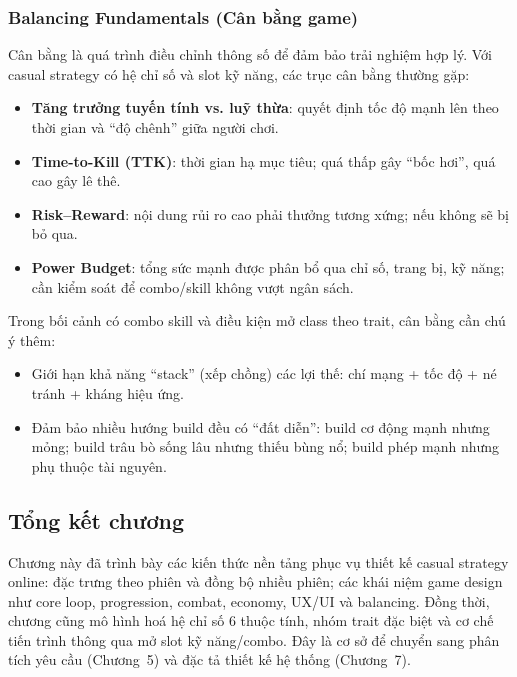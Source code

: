 \subsubsection{Balancing Fundamentals (Cân bằng game)}

Cân bằng là quá trình điều chỉnh thông số để đảm bảo trải nghiệm hợp lý\cite{adams-game-design,schell-art}. Với casual strategy có hệ chỉ số và slot kỹ năng, các trục cân bằng thường gặp:

\begin{itemize}
    \item \textbf{Tăng trưởng tuyến tính vs. luỹ thừa}: quyết định tốc độ mạnh lên theo thời gian và ``độ chênh'' giữa người chơi.
    \item \textbf{Time-to-Kill (TTK)}: thời gian hạ mục tiêu; quá thấp gây ``bốc hơi'', quá cao gây lê thê.
    \item \textbf{Risk--Reward}: nội dung rủi ro cao phải thưởng tương xứng; nếu không sẽ bị bỏ qua.
    \item \textbf{Power Budget}: tổng sức mạnh được phân bổ qua chỉ số, trang bị, kỹ năng; cần kiểm soát để combo/\allowbreak skill không vượt ngân sách.
\end{itemize}

Trong bối cảnh có combo skill và điều kiện mở class theo trait, cân bằng cần chú ý thêm:
\begin{itemize}
    \item Giới hạn khả năng ``stack'' (xếp chồng) các lợi thế: chí mạng + tốc độ + né tránh + kháng hiệu ứng.
    \item Đảm bảo nhiều hướng build đều có ``đất diễn'': build cơ động mạnh nhưng mỏng; build trâu bò sống lâu nhưng thiếu bùng nổ; build phép mạnh nhưng phụ thuộc tài nguyên.
\end{itemize}

\subsection{Tổng kết chương}

Chương này đã trình bày các kiến thức nền tảng phục vụ thiết kế casual strategy online: đặc trưng theo phiên và đồng bộ nhiều phiên; các khái niệm game design như core loop, progression, combat, economy, UX/\allowbreak UI và balancing\cite{adams-game-design,schell-art,moriarty-networked,gaffer-networking}. Đồng thời, chương cũng mô hình hoá hệ chỉ số 6 thuộc tính, nhóm trait đặc biệt và cơ chế tiến trình thông qua mở slot kỹ năng/\allowbreak combo. Đây là cơ sở để chuyển sang phân tích yêu cầu (Chương~5) và đặc tả thiết kế hệ thống (Chương~7).

